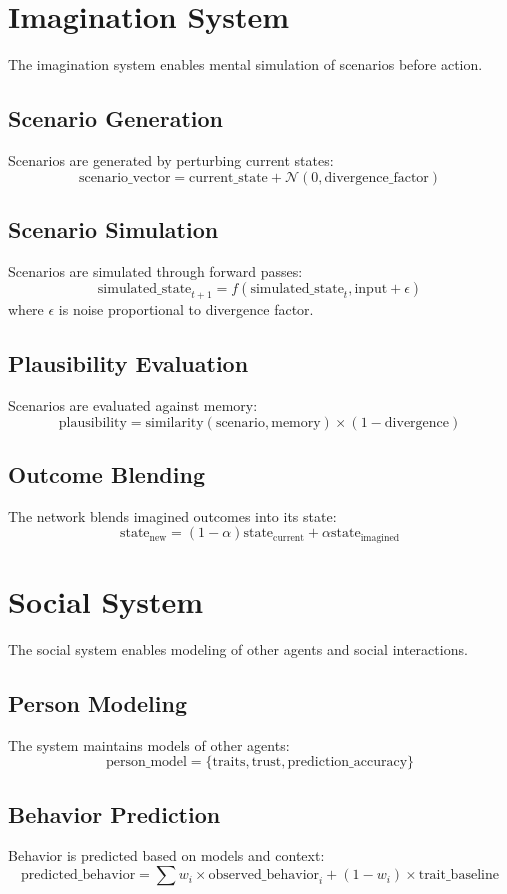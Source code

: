 \documentclass{article}
\begin{document}
\section{Imagination System}
The imagination system enables mental simulation of scenarios before action.

\subsection{Scenario Generation}
Scenarios are generated by perturbing current states:
\[
\text{scenario\_vector} = \text{current\_state} + \mathcal{N}(0, \text{divergence\_factor})
\]

\subsection{Scenario Simulation}
Scenarios are simulated through forward passes:
\[
\text{simulated\_state}_{t+1} = f(\text{simulated\_state}_t, \text{input} + \epsilon)
\]
where $\epsilon$ is noise proportional to divergence factor.

\subsection{Plausibility Evaluation}
Scenarios are evaluated against memory:
\[
\text{plausibility} = \text{similarity}(\text{scenario}, \text{memory}) \times (1 - \text{divergence})
\]

\subsection{Outcome Blending}
The network blends imagined outcomes into its state:
\[
\text{state}_{\text{new}} = (1 - \alpha)\text{state}_{\text{current}} + \alpha\text{state}_{\text{imagined}}
\]

\section{Social System}
The social system enables modeling of other agents and social interactions.

\subsection{Person Modeling}
The system maintains models of other agents:
\[
\text{person\_model} = \{\text{traits}, \text{trust}, \text{prediction\_accuracy}\}
\]

\subsection{Behavior Prediction}
Behavior is predicted based on models and context:
\[
\text{predicted\_behavior} = \sum w_i \times \text{observed\_behavior}_i + (1 - w_i) \times \text{trait\_baseline}
\]
\end{document}
